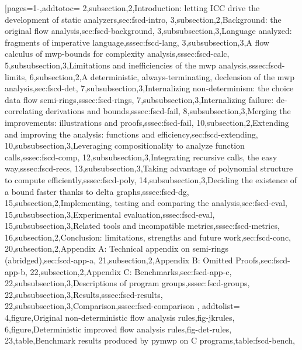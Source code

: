 [pages={1-},addtotoc={
    2,subsection,2,{Introduction: letting ICC drive the development of static analyzers},sec:fscd-intro,
    3,subsection,2,{Background: the original flow analysis},sec:fscd-background,
    3,subsubsection,3,{Language analyzed: fragments of imperative language},sssec:fscd-lang,
    3,subsubsection,3,{A flow calculus of mwp-bounds for complexity analysis},sssec:fscd-calc,
    5,subsubsection,3,{Limitations and inefficiencies of the mwp analysis},sssec:fscd-limits,
    6,subsection,2,{A deterministic, always-terminating, declension of the mwp analysis},sec:fscd-det,
    7,subsubsection,3,{Internalizing non-determinism: the choice data flow semi-rings},sssec:fscd-rings,
    7,subsubsection,3,{Internalizing failure: de-correlating derivations and bounds},sssec:fscd-fail,
    8,subsubsection,3,{Merging the improvements: illustrations and proofs},sssec:fscd-fail,
    10,subsection,2,{Extending and improving the analysis: functions and efficiency},sec:fscd-extending,
    10,subsubsection,3,{Leveraging compositionality to analyze function calls},sssec:fscd-comp,
    12,subsubsection,3,{Integrating recursive calls, the easy way},sssec:fscd-recs,
    13,subsubsection,3,{Taking advantage of polynomial structure to compute efficiently},sssec:fscd-poly,
    14,subsubsection,3,{Deciding the existence of a bound faster thanks to delta graphs},sssec:fscd-dg,
    15,subsection,2,{Implementing, testing and comparing the analysis},sec:fscd-eval,
    15,subsubsection,3,{Experimental evaluation},sssec:fscd-eval,
    15,subsubsection,3,{Related tools and incompatible metrics},sssec:fscd-metrics,
    16,subsection,2,{Conclusion: limitations, strengths and future work},sec:fscd-conc,
    20,subsection,2,{Appendix A: Technical appendix on semi-rings (abridged)},sec:fscd-app-a,
    21,subsection,2,{Appendix B: Omitted Proofs},sec:fscd-app-b,
    22,subsection,2,{Appendix C: Benchmarks},sec:fscd-app-c,
    22,subsubsection,3,{Descriptions of program groups},sssec:fscd-groups,
    22,subsubsection,3,{Results},sssec:fscd-results,
    22,subsubsection,3,{Comparison},sssec:fscd-comparison
}, addtolist={
    4,figure,{Original non-deterministic flow analysis rules},fig-jkrules,
    6,figure,{Deterministic improved flow analysis rules},fig-det-rules,
    23,table,{Benchmark results produced by pymwp on C programs},table:fscd-bench},
